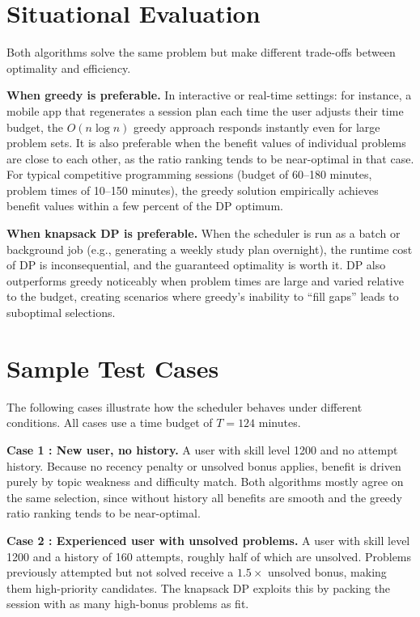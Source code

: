 \documentclass{article}
\begin{document}
\section{Situational Evaluation}
 
Both algorithms solve the same problem but make different trade-offs
between optimality and efficiency.
 
\textbf{When greedy is preferable.}
In interactive or real-time settings: for instance, a mobile app
that regenerates a session plan each time the user adjusts their time
budget, the $O(n \log n)$ greedy approach responds instantly even
for large problem sets. It is also preferable when the benefit values
of individual problems are close to each other, as the ratio ranking
tends to be near-optimal in that case. For typical competitive
programming sessions (budget of 60--180 minutes, problem times of
10--150 minutes), the greedy solution empirically achieves benefit
values within a few percent of the DP optimum.
 
\textbf{When knapsack DP is preferable.}
When the scheduler is run as a batch or background job (e.g.,
generating a weekly study plan overnight), the runtime cost of DP
is inconsequential, and the guaranteed optimality is worth it. DP
also outperforms greedy noticeably when problem times are large and
varied relative to the budget, creating scenarios where greedy's
inability to ``fill gaps'' leads to suboptimal selections.

\section{Sample Test Cases}

The following cases illustrate how the scheduler behaves under different
conditions. All cases use a time budget of $T = 124$ minutes.

\textbf{Case 1 : New user, no history.}
A user with skill level 1200 and no attempt history. Because no
recency penalty or unsolved bonus applies, benefit is driven purely by
topic weakness and difficulty match. Both algorithms mostly agree on the same
selection, since without history all benefits are smooth and the greedy
ratio ranking tends to be near-optimal.

\textbf{Case 2 : Experienced user with unsolved problems.}
A user with skill level 1200 and a history of 160 attempts, roughly
half of which are unsolved. Problems previously attempted but not solved
receive a $1.5\times$ unsolved bonus, making them high-priority
candidates. The knapsack DP exploits this by packing the session with
as many high-bonus problems as fit.
\end{document}
